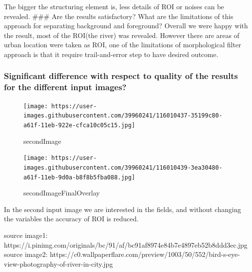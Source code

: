 \documentclass[11pt,a4paper]{scartcle}
\begin{document}
The bigger the structuring element is, less details of ROI or noises can be revealed. \#\#\# Are the results satisfactory? What are the  limitations of this approach for separating background and foreground? Overall we were happy with the result, most of the ROI(the river) was revealed. However there are areas of urban location were taken as ROI, one of the limitations of morphological filter approach is that it require trail-and-error step to have desired outcome.

\hypertarget{significant-difference-with-respect-to-quality-of-the-results-for-the-different-input-images}{%
\subsubsection{Significant difference with respect to quality of the results for the different input images?}\label{significant-difference-with-respect-to-quality-of-the-results-for-the-different-input-images}}

\begin{figure}
\centering
\texttt{[image: https://user-images.githubusercontent.com/39960241/116010437-35199c80-a61f-11eb-922e-cfca10c05c15.jpg]}
\caption{secondImage}
\end{figure}

\begin{figure}
\centering
\texttt{[image: https://user-images.githubusercontent.com/39960241/116010439-3ea30480-a61f-11eb-9d0a-b8f8b5fba088.jpg]}
\caption{secondImageFinalOverlay}
\end{figure}

In the second input image we are interested in the fields, and without changing the variables the accuracy of ROI is reduced.

source image1:
https://i.pinimg.com/originals/bc/91/af/bc91af8974e84b7e4897eb52b8ddd3ec.jpg
source image2:
https://c0.wallpaperflare.com/preview/1003/50/552/bird-s-eye-view-photography-of-river-in-city.jpg
\end{document}
